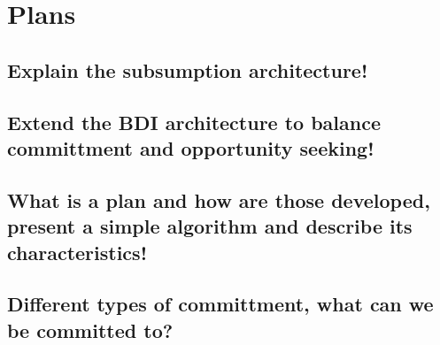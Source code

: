 \section{Plans}
\subsection{Explain the subsumption architecture!}
\subsection{Extend the BDI architecture to balance committment and opportunity seeking!}
\subsection{What is a plan and how are those developed, present a simple algorithm and describe its characteristics!}
\subsection{Different types of committment, what can we be committed to?}

